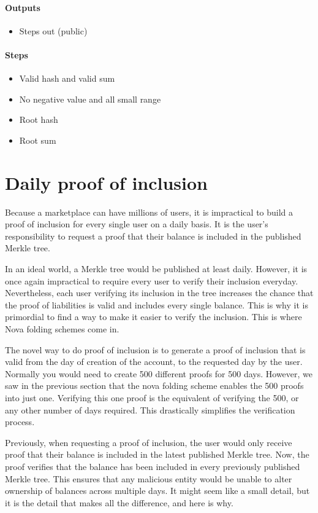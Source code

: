 \paragraph{Outputs}
\begin{itemize}
   \item Steps out (public)
   \end{itemize}

\paragraph{Steps}
\begin{itemize}
   \item Valid hash and valid sum
   \item No negative value and all small range
   \item Root hash
   \item Root sum
   \end{itemize}


\section{Daily proof of inclusion}

Because a marketplace can have millions of users, it is impractical to build a proof of inclusion for every single user on a daily basis.
It is the user's responsibility to request a proof that their balance is included in the published Merkle tree.

In an ideal world, a Merkle tree would be published at least daily. However, it is once again impractical to require every user to verify their inclusion everyday.
Nevertheless, each user verifying its inclusion in the tree increases the chance that the proof of liabilities is valid and includes every single balance.
This is why it is primordial to find a way to make it easier to verify the inclusion. This is where Nova folding schemes come in.

The novel way to do proof of inclusion is to generate a proof of inclusion that is valid from the day of creation of the account, to the requested day by the user.
Normally you would need to create 500 different proofs for 500 days. However, we saw in the previous section that the nova folding scheme enables the 500 proofs into just one.
Verifying this one proof is the equivalent of verifying the 500, or any other number of days required.
This drastically simplifies the verification process.

Previously, when requesting a proof of inclusion, the user would only receive proof that their balance is included in the latest published Merkle tree. Now, the proof verifies that the balance has been included in every previously published Merkle tree.
This ensures that any malicious entity would be unable to alter ownership of balances across multiple days. It might seem like a small detail, but it is the detail that makes all the difference, and here is why.

